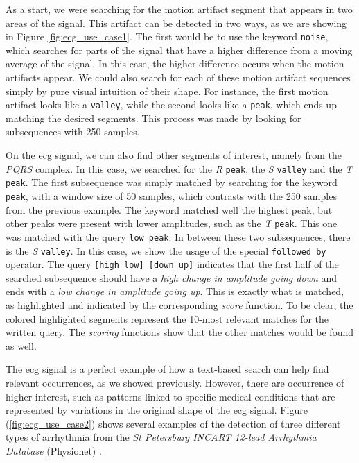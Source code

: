 As a start, we were searching for the motion artifact segment that appears in two areas of the signal. This artifact can be detected in two ways, as we are showing in Figure \ref{fig:ecg_use_case1}. The first would be to use the keyword \texttt{noise}, which searches for parts of the signal that have a higher difference from a moving average of the signal. In this case, the higher difference occurs when the motion artifacts appear. We could also search for each of these motion artifact sequences simply by pure visual intuition of their shape. For instance, the first motion artifact looks like a \texttt{valley}, while the second looks like a \texttt{peak}, which ends up matching the desired segments. This process was made by looking for subsequences with 250 samples.
\par
On the \gls{ecg} signal, we can also find other segments of interest, namely from the \textit{PQRS} complex. In this case, we searched for the \textit{R} \texttt{peak}, the \textit{S} \texttt{valley} and the \textit{T} \texttt{peak}. The first subsequence was simply matched by searching for the keyword \texttt{peak}, with a window size of 50 samples, which contrasts with the 250 samples from the previous example. The keyword matched well the highest peak, but other peaks were present with lower amplitudes, such as the \textit{T} \texttt{peak}. This one was matched with the query \texttt{low peak}. In between these two subsequences, there is the \textit{S} \texttt{valley}. In this case, we show the usage of the special \texttt{followed by} operator. The query \texttt{[high low] [down up]} indicates that the first half of the searched subsequence should have a \textit{high change in amplitude going down} and ends with a \textit{low change in amplitude going up}. This is exactly what is matched, as highlighted and indicated by the corresponding \textit{score} function. To be clear, the colored highlighted segments represent the 10-most relevant matches for the written query. The \textit{scoring} functions show that the other matches would be found as well.
\par
The \gls{ecg} signal is a perfect example of how a text-based search can help find relevant occurrences, as we showed previously. However, there are occurrence of higher interest, such as patterns linked to specific medical conditions that are represented by variations in the original shape of the \gls{ecg} signal. Figure (\ref{fig:ecg_use_case2}) shows several examples of the detection of three different types of arrhythmia from the \textit{St Petersburg INCART 12-lead Arrhythmia Database} (Physionet) \cite{PhysioNet}.

